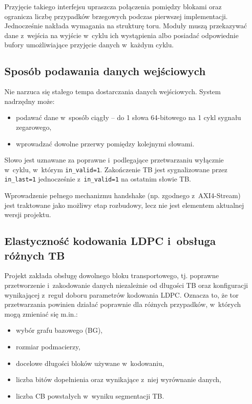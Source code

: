 Przyjęcie takiego interfejsu upraszcza połączenia pomiędzy blokami oraz ogranicza liczbę przypadków brzegowych podczas pierwszej implementacji. Jednocześnie nakłada wymagania na strukturę toru. Moduły muszą przekazywać dane z~wejścia na wyjście w~cyklu ich wystąpienia albo posiadać odpowiednie bufory umożliwiające przyjęcie danych w~każdym cyklu.


\subsection{Sposób podawania danych wejściowych}
Nie narzuca się stałego tempa dostarczania danych wejściowych. System nadrzędny może:
\begin{itemize}
    \item podawać dane w~sposób ciągły -- do 1 słowa 64-bitowego na 1 cykl sygnału zegarowego,
    \item wprowadzać dowolne przerwy pomiędzy kolejnymi słowami.
\end{itemize}

Słowo jest uznawane za poprawne i~podlegające przetwarzaniu wyłącznie w~cyklu, w~którym \texttt{in\_valid=1}. Zakończenie TB jest sygnalizowane przez \texttt{in\_last=1} jednocześnie z~\texttt{in\_valid=1} na ostatnim słowie TB.

Wprowadzenie pełnego mechanizmu handshake (np. zgodnego z~AXI4-Stream) jest traktowane jako możliwy etap rozbudowy, lecz nie jest elementem aktualnej wersji projektu.

\subsection{Elastyczność kodowania LDPC i~obsługa różnych TB}
Projekt zakłada obsługę dowolnego bloku transportowego, tj. poprawne przetworzenie i~zakodowanie danych niezależnie od długości TB oraz konfiguracji wynikającej z~reguł doboru parametrów kodowania LDPC. Oznacza to, że tor przetwarzania powinien działać poprawnie dla różnych przypadków, w~których mogą zmieniać się m.in.:
\begin{itemize}
    \item wybór grafu bazowego (BG),
    \item rozmiar podmacierzy,
    \item docelowe długości bloków używane w~kodowaniu,
    \item liczba bitów dopełnienia oraz wynikające z~niej wyrównanie danych,
    \item liczba CB powstałych w~wyniku segmentacji TB.
\end{itemize}


